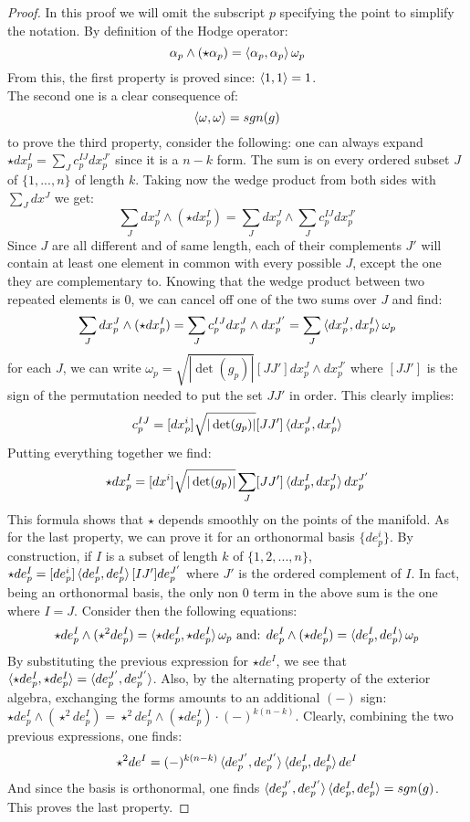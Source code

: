 \documentclass[12pt,a4paper]{report}
\theoremstyle{definition}
\theoremstyle{Theorem}
\theoremstyle{definition}
\theoremstyle{definition}
\begin{document}
	\begin{proof}
		In this proof we will omit the subscript $p$ specifying the point to simplify the notation. 
		By definition of the Hodge operator:
		$$\alpha_p\wedge(\star\alpha_p)=\braket{\alpha_p,\alpha_p}\omega_p$$
		From this, the first property is proved since: $\braket{1,1}=1$.\\
		The second one is a clear consequence of:
		$$\braket{\omega,\omega}=sgn(g)$$
		to prove the third property, consider the following: one can always expand $\star dx^I_p=\sum_Jc_p^{IJ}dx_p^{J'}$ since it is a $n-k$ form. The sum is on every ordered subset $J$ of $\{1,...,n\}$ of length $k$. Taking now the wedge product from both sides with $\sum_J dx^J$ we get:
		$$\sum_Jdx_p^J\wedge(\star dx_p^I)=\sum_Jdx_p^J\wedge\sum_Jc_p^{IJ}dx_p^{J'}$$
		Since $J$ are all different and of same length, each of their complements $J'$ will contain at least one element in common with every possible $J$, except the one they are complementary to. Knowing that the wedge product between two repeated elements is 0, we can cancel off one of the two sums over $J$ and find:
		$$\sum_Jdx_p^J\wedge(\star dx_p^I)=\sum_Jc_p^{IJ}dx_p^J\wedge dx_p^{J'}=\sum_J\braket{dx_p^J,dx_p^I}\omega_p$$
		for each $J$, we can write $\omega_p=\sqrt{|\det(g_p)|}[JJ']dx_p^J\wedge dx_p^{J'}$ where $[JJ']$ is the sign of the permutation needed to put the set $JJ'$ in order. This clearly implies:
		$$c_p^{IJ}=[dx_p^i]\sqrt{|\det(g_p)|}[JJ']\braket{dx_p^J,dx_p^I}$$
		Putting everything together we find:
		$$\star dx_p^I=[dx^i]\sqrt{|\det(g_p)|}\sum_J[JJ']\braket{dx_p^I,dx_p^J}dx_p^{J'}$$
		This formula shows that $\star$ depends smoothly on the points of the manifold.
		As for the last property, we can prove it for an orthonormal basis $\{de_p^i\}$. By construction, if $I$ is a subset of length $k$ of $\{1,2,...,n\}$, $\star de_p^I=[de_p^i]\braket{de_p^I,de_p^I}[IJ'] de_p^{J'}$ where $J'$ is the ordered complement of $I$. In fact, being an orthonormal basis, the only non 0 term in the above sum is the one where $I=J$. Consider then the following equations:
		$$\star de_p^I\wedge (\star^2 de_p^I)=\braket{\star de_p^I,\star de_p^I}\omega_p\hbox{ and: } de_p^I\wedge (\star de_p^I)=\braket{de_p^I,de_p^I}\omega_p$$
		By substituting the previous expression for $\star de^I$, we see that $\braket{\star de_p^I,\star de_p^I}=\braket{de_p^{J'}, de_p^{J'}}$. Also, by the alternating property of the exterior algebra, exchanging the forms amounts to an additional $(-)$ sign: $\star de_p^I\wedge (\star^2 de_p^I)=\star^2 de_p^I\wedge (\star de_p^I)\cdot (-)^{k(n-k)}$. Clearly, combining the two previous expressions, one finds:
		$$\star^2 de^I=(-)^{k(n-k)}\braket{de_p^{J'}, de_p^{J'}}\braket{de_p^{I}, de_p^{I}}de^I$$
		And since the basis is orthonormal, one finds $\braket{de_p^{J'}, de_p^{J'}}\braket{de_p^{I}, de_p^{I}}=sgn(g)$. This proves the last property.
	\end{proof}
\end{document}
